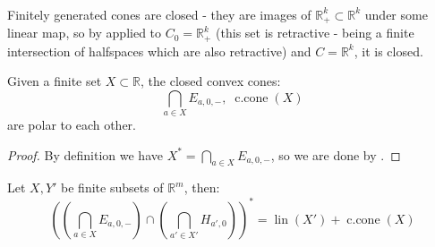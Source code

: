\paragraph{}Finitely generated cones are closed - they are images of $\mathbb{R}_+^k\subset \mathbb{R}^k$ under some linear map, so by  applied to $C_0=\mathbb{R}_+^k$ (this set is retractive - being a finite intersection of halfspaces which are also retractive) and $C=\mathbb{R}^k$, it is closed.

\begin{prop}\label{prop:017-farkas}
	Given a finite set $X\subset \mathbb{R}$, the closed convex cones:
	\[
		\bigcap_{a\in X}E_{a,0,-},\;\operatorname{c.cone}(X)
	\]
	are polar to each other.
\end{prop}

\begin{proof}
	By definition we have $X^\ast=\bigcap_{a\in X}E_{a,0,-}$, so we are done by .
\end{proof}

\begin{exmp}
	Let $X,Y'$ be finite subsets of $\mathbb{R}^m$, then:
	\[
		\left(\left(\bigcap_{a\in X}E_{a,0,-}\right)\cap \left(\bigcap_{a'\in X'}H_{a',0}\right)\right)^\ast
		=\operatorname{lin}(X')+\operatorname{c.cone}(X)
	\]
\end{exmp}

